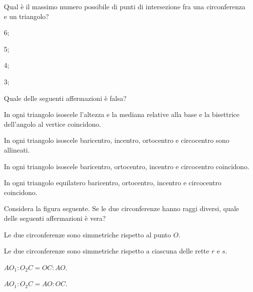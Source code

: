 \begin{esercizio}
\label{ese:5.65}
Qual è il massimo numero possibile di punti di intersezione fra una 
circonferenza e un triangolo?
\begin{multicols}{4}
\begin{enumeratea}
\item 6;
\item 5;
\item 4;
\item 3;
\end{enumeratea}
\end{multicols}
\end{esercizio}

\begin{esercizio}
\label{ese:5.66}
Quale delle seguenti affermazioni è falsa? 
\begin{enumeratea}
\item In ogni triangolo isoscele l'altezza e la mediana relative alla 
base e la bisettrice dell'angolo al vertice coincidono.
\item In ogni triangolo isoscele baricentro, incentro, ortocentro e 
circocentro sono allineati.
\item In ogni triangolo isoscele baricentro, ortocentro, incentro e 
circocentro coincidono.
\item In ogni triangolo equilatero baricentro, ortocentro, incentro e 
circocentro coincidono.
\end{enumeratea}
\end{esercizio}

\begin{esercizio}
\label{ese:5.67}
Considera la figura seguente. Se le due circonferenze hanno raggi 
diversi, quale delle seguenti affermazioni è vera?
\begin{enumeratea}
\item Le due circonferenze sono simmetriche rispetto al punto $O$.
\item Le due circonferenze sono simmetriche rispetto a ciascuna delle 
rette $r$ e $s$.
\item $AO_1:O_2C=OC:AO$.
\item $AO_1:O_2C=AO:OC$.
\end{enumeratea}
\end{esercizio}

\begin{inaccessibleblock}
 \begin{figure}[!htb]
	\centering
\end{figure}
\end{inaccessibleblock}

